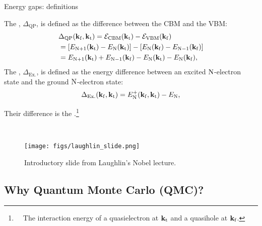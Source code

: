 \documentclass[10pt, pdf, hyperref={draft}, usenames, dvipsnames]{beamer}
\newcommand{\blue}[1]{{\bf\color{NavyBlue}{#1}}}
\newcommand{\kfr}{{\bf k}_{\rm f}}
\newcommand{\kto}{{\bf k}_{\rm t}}
\begin{document}
\begin{frame}{Energy gaps: definitions}

The \blue{quasiparticle gap}, $\Delta_{\text{QP}}$, is defined as the
difference between the CBM and the VBM:
\begin{align}
  &\Delta_{\text{QP}}(\kfr,\kto)={\cal E}_{\text{CBM}}(\kto)-
  {\cal E}_{\text{VBM}}(\kfr)
  \nonumber \\
  &=\left[E_{{\rm N}+1}(\kto)-E_{\rm N}(\kto)\right]-
    \left[E_{\rm N}(\kfr)-E_{{\rm N}-1}(\kfr)\right] \nonumber \\
  &=E_{{\rm N}+1}(\kto)+E_{{\rm N}-1}(\kfr)-E_{\rm N}(\kto)-E_{\rm N}(\kfr),
\end{align}
\vfill
The \blue{excitonic gap}, $\Delta_{\text{Ex.}}$, is defined as the energy
difference between an excited $\rm N$-electron state and the ground
$\rm N$-electron state:
\begin{equation}
  \Delta_{\text{Ex.}}(\kfr,\kto) = E^{+}_{\rm N}(\kfr, \kto) - E_{\rm N},
\end{equation}

Their difference is the \blue{exciton binding}.\footnote{~~The interaction
energy of a quasielectron at $\kto$ and a quasihole at $\kfr$.}
\end{frame}

\begin{frame}{\ }
\vspace{-1cm}
\begin{figure}[H]
  \centering
  \texttt{[image: figs/laughlin\_slide.png]}
  \caption{Introductory slide from Laughlin's Nobel lecture.}
\label{fig:laughlin_slide}
\end{figure}
\end{frame}


\subsection{Why Quantum Monte Carlo (QMC)?}
\end{document}
